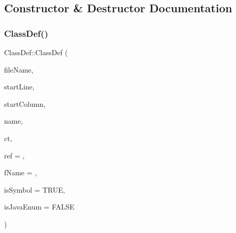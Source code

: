 \subsection{Constructor \& Destructor Documentation}
\mbox{\label{class_class_def_a333dcbd4c69ab13830072caaf0d9db62}} 
\subsubsection{\texorpdfstring{ClassDef()}{ClassDef()}}
{\footnotesize\ttfamily Class\+Def\+::\+Class\+Def (\begin{DoxyParamCaption}\item[{const char $\ast$}]{file\+Name,  }\item[{int}]{start\+Line,  }\item[{int}]{start\+Column,  }\item[{const char $\ast$}]{name,  }\item[{\mbox{\hyperlink{class_class_def_ae70cf86d35fe954a94c566fbcfc87939}{Compound\+Type}}}]{ct,  }\item[{const char $\ast$}]{ref = {},  }\item[{const char $\ast$}]{f\+Name = {},  }\item[{bool}]{is\+Symbol = {\ttfamily TRUE},  }\item[{bool}]{is\+Java\+Enum = {\ttfamily FALSE} }\end{DoxyParamCaption})}

